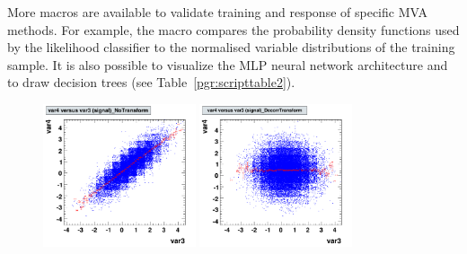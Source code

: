 More macros are available to validate training and response of specific
MVA methods. For example, the macro  compares the
probability density functions used by the likelihood classifier to the normalised
variable distributions of the training sample. It is also possible to visualize
the MLP neural network architecture and to draw decision trees (see
Table~\ref{pgr:scripttable2}).
\begin{figure}[t]
\begin{center}
  \def\thissize{0.40}
  \includegraphics[width=\thissize\textwidth]{plots/correlationscatter__NoTransform_c1}
  \includegraphics[width=\thissize\textwidth]{plots/correlationscatter__DecorrTransform_c1}


\end{center}
\end{figure}
